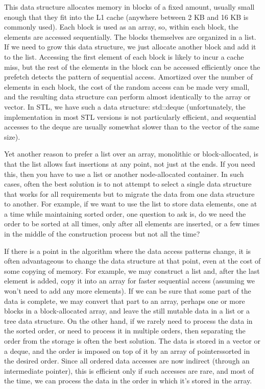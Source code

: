 This data structure allocates memory in blocks of a fixed amount, usually small enough that they fit into the L1 cache (anywhere between 2 KB and 16 KB is commonly used). Each block is used as an array, so, within each block, the elements are accessed sequentially. The blocks themselves are organized in a list. If we need to grow this data structure, we just allocate another block and add it to the list. Accessing the first element of each block is likely to incur a cache miss, but the rest of the elements in the block can be accessed efficiently once the prefetch detects the pattern of sequential access. Amortized over the number of elements in each block, the cost of the random access can be made very small, and the resulting data structure can perform almost identically to the array or vector. In STL, we have such a data structure: std::deque (unfortunately, the implementation in most STL versions is not particularly efficient, and sequential accesses to the deque are usually somewhat slower than to the vector of the same size).

Yet another reason to prefer a list over an array, monolithic or block-allocated, is that the list allows fast insertions at any point, not just at the ends. If you need this, then you have to use a list or another node-allocated container. In such cases, often the best solution is to not attempt to select a single data structure that works for all requirements but to migrate the data from one data structure to another. For example, if we want to use the list to store data elements, one at a time while maintaining sorted order, one question to ask is, do we need the order to be sorted at all times, only after all elements are inserted, or a few times in the middle of the construction process but not all the time?

If there is a point in the algorithm where the data access patterns change, it is often advantageous to change the data structure at that point, even at the cost of some copying of memory. For example, we may construct a list and, after the last element is added, copy it into an array for faster sequential access (assuming we won't need to add any more elements). If we can be sure that some part of the data is complete, we may convert that part to an array, perhaps one or more blocks in a block-allocated array, and leave the still mutable data in a list or a tree data structure. On the other hand, if we rarely need to process the data in the sorted order, or need to process it in multiple orders, then separating the order from the storage is often the best solution. The data is stored in a vector or a deque, and the order is imposed on top of it by an array of pointerssorted in the desired order.  Since all ordered data accesses are now indirect (through an intermediate pointer), this is efficient only if such accesses are rare, and most of the time, we can process the data in the order in which it's stored in the array.

